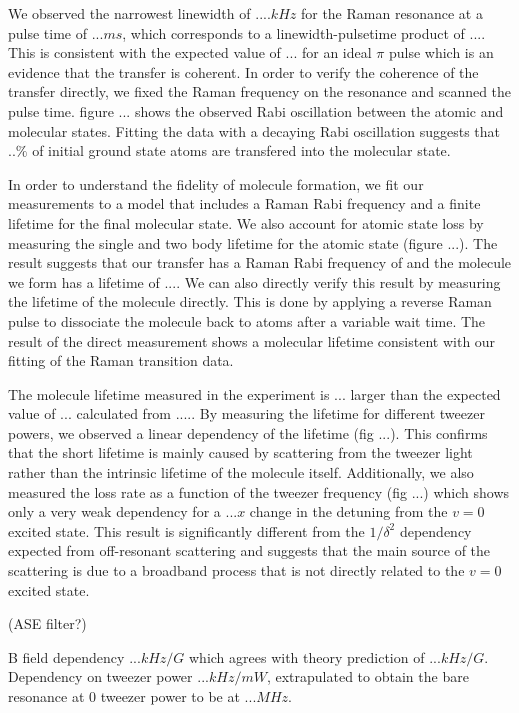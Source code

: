 \documentclass[aps,prl,twocolumn,groupedaddress]{revtex4-1}
\newcommand{\todo}[1]{}
\begin{document}
We observed the narrowest linewidth of $.... kHz$ for the Raman resonance at a pulse time of $... ms$, which corresponds to a linewidth-pulsetime product of $...$. This is consistent with the expected value of $...$ for an ideal $\pi$ pulse which is an evidence that the transfer is coherent. In order to verify the coherence of the transfer directly, we fixed the Raman frequency on the resonance and scanned the pulse time. figure ... shows the observed Rabi oscillation between the atomic and molecular states. Fitting the data with a decaying Rabi oscillation suggests that $..\%$ of initial ground state atoms are transfered into the molecular state.

In order to understand the fidelity of molecule formation, we fit our measurements to a model that includes a Raman Rabi frequency and a finite lifetime for the final molecular state. We also account for atomic state loss by measuring the single and two body lifetime for the atomic state (figure ...). The result suggests that our transfer has a Raman Rabi frequency of and the molecule we form has a lifetime of $...$. We can also directly verify this result by measuring the lifetime of the molecule directly. This is done by applying a reverse Raman pulse to dissociate the molecule back to atoms after a variable wait time. The result of the direct measurement shows a molecular lifetime consistent with our fitting of the Raman transition data.

The molecule lifetime measured in the experiment is $...$ larger than the expected value of $...$ calculated from ..... By measuring the lifetime for different tweezer powers, we observed a linear dependency of the lifetime (fig ...). This confirms that the short lifetime is mainly caused by scattering from the tweezer light rather than the intrinsic lifetime of the molecule itself. Additionally, we also measured the loss rate as a function of the tweezer frequency (fig ...) which shows only a very weak dependency for a $...x$ change in the detuning from the $v=0$ excited state. This result is significantly different from the $1/\delta^2$ dependency expected from off-resonant scattering and suggests that the main source of the scattering is due to a broadband process that is not directly related to the $v=0$ excited state.

(ASE filter?)

B field dependency $... kHz/G$ which agrees with theory prediction of $... kHz/G$.
Dependency on tweezer power $... kHz/mW$, extrapulated to obtain the bare resonance at $0$ tweezer power to be at $... MHz$.

\todo{sm: STIRAP vs Raman}


\end{document}
